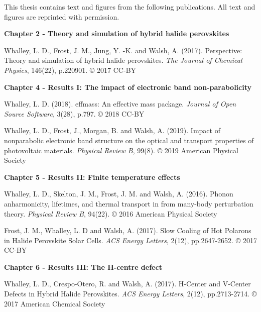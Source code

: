 
This thesis contains text and figures from the following publications. All text and figures are reprinted with permission.

\vspace{\frontmatterbaselineskip}

\textbf{Chapter 2 - Theory and simulation of hybrid halide perovskites } 

Whalley, L. D., Frost, J. M., Jung, Y. -K. and Walsh, A. (2017). Perspective: Theory and simulation of hybrid halide perovskites. \textit{The Journal of Chemical Physics}, 146(22), p.220901. © 2017 CC-BY
\vspace{\frontmatterbaselineskip}

\textbf{Chapter 4  - Results I: The impact of electronic band non-parabolicity}

Whalley, L. D. (2018). effmass: An effective mass package. \textit{Journal of Open Source Software}, 3(28), p.797. © 2018 CC-BY 

Whalley, L. D., Frost, J., Morgan, B. and Walsh, A. (2019). Impact of nonparabolic electronic band structure on the optical and transport properties of photovoltaic materials. \textit{Physical Review B}, 99(8). © 2019 American Physical Society
\vspace{\frontmatterbaselineskip}

\textbf{Chapter 5  - Results II: Finite temperature effects}

Whalley, L. D., Skelton, J. M., Frost, J. M. and Walsh, A. (2016). Phonon anharmonicity, lifetimes, and thermal transport in  from many-body perturbation theory. \textit{Physical Review B}, 94(22). © 2016 American Physical Society

Frost, J. M., Whalley, L. D and Walsh, A. (2017). Slow Cooling of Hot Polarons in Halide Perovskite Solar Cells. \textit{ACS Energy Letters}, 2(12), pp.2647-2652. © 2017 CC-BY
\vspace{\frontmatterbaselineskip}

\textbf{Chapter 6  - Results III: The H-centre defect}

Whalley, L. D., Crespo-Otero, R. and Walsh, A. (2017). H-Center and V-Center Defects in Hybrid Halide Perovskites. \textit{ACS Energy Letters}, 2(12), pp.2713-2714. © 2017 American Chemical Society 



